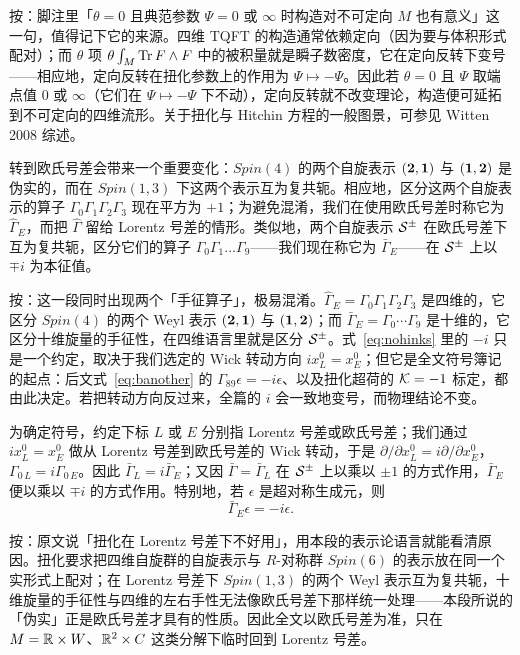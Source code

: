 \begin{yizhu}[物理图像]
按：脚注里「$\theta=0$ 且典范参数 $\Psi=0$ 或 $\infty$ 时构造对不可定向 $M$ 也有意义」这一句，值得记下它的来源。四维 TQFT 的构造通常依赖定向（因为要与体积形式配对）；而 $\theta$ 项 $\theta\int_M\Tr F\wedge F$ 中的被积量就是瞬子数密度，它在定向反转下变号——相应地，定向反转在扭化参数上的作用为 $\Psi\mapsto-\Psi$。因此若 $\theta=0$ 且 $\Psi$ 取端点值 $0$ 或 $\infty$（它们在 $\Psi\mapsto-\Psi$ 下不动），定向反转就不改变理论，构造便可延拓到不可定向的四维流形。关于扭化与 Hitchin 方程的一般图景，可参见 Witten 2008 综述。
\end{yizhu}

转到欧氏号差会带来一个重要变化：$Spin(4)$ 的两个自旋表示 $(\btwo,\bone)$ 与 $(\bone,\btwo)$ 是伪实的，而在 $Spin(1,3)$ 下这两个表示互为复共轭。相应地，区分这两个自旋表示的算子 $\Gamma_0\Gamma_1\Gamma_2\Gamma_3$ 现在平方为 $+1$；为避免混淆，我们在使用欧氏号差时称它为 $\hat\Gamma_E$，而把 $\hat\Gamma$ 留给 Lorentz 号差的情形。类似地，两个自旋表示 ${\EUS}^\pm$ 在欧氏号差下互为复共轭，区分它们的算子 $\Gamma_0\Gamma_1\dots\Gamma_9$——我们现在称它为 $\bar\Gamma_E$——在 ${\EUS}^\pm$ 上以 $\mp i$ 为本征值。

\begin{yizhu}[易错点]
按：这一段同时出现两个「手征算子」，极易混淆。$\hat\Gamma_E=\Gamma_0\Gamma_1\Gamma_2\Gamma_3$ 是四维的，它区分 $Spin(4)$ 的两个 Weyl 表示 $(\btwo,\bone)$ 与 $(\bone,\btwo)$；而 $\bar\Gamma_E=\Gamma_0\cdots\Gamma_9$ 是十维的，它区分十维旋量的手征性，在四维语言里就是区分 ${\EUS}^\pm$。式~\eqref{eq:nohinks} 里的 $-i$ 只是一个约定，取决于我们选定的 Wick 转动方向 $ix^0_L=x^0_E$；但它是全文符号簿记的起点：后文式~\eqref{eq:banother} 的 $\Gamma_{89}\epsilon=-i\epsilon$、以及扭化超荷的 $\EUK=-1$ 标定，都由此决定。若把转动方向反过来，全篇的 $i$ 会一致地变号，而物理结论不变。
\end{yizhu}

为确定符号，约定下标 $L$ 或 $E$ 分别指 Lorentz 号差或欧氏号差；我们通过 $ix^0_L=x^0_E$ 做从 Lorentz 号差到欧氏号差的 Wick 转动，于是 $\partial/\partial x^0_L=i\partial/\partial x^0_E$，$\Gamma_{0\,L}=i\Gamma_{0\,E}$。因此 $\bar\Gamma_L=i\bar\Gamma_E$；又因 $\bar\Gamma=\bar\Gamma_L$ 在 ${\EUS}^\pm$ 上以乘以 $\pm 1$ 的方式作用，$\bar\Gamma_E$ 便以乘以 $\mp i$ 的方式作用。特别地，若 $\epsilon$ 是超对称生成元，则
\setcounter{equation}{0}
\begin{equation}\label{eq:nohinks}
\bar\Gamma_E\epsilon=-i\epsilon.
\end{equation}

\begin{yizhu}[含糊点拨]
按：原文说「扭化在 Lorentz 号差下不好用」，用本段的表示论语言就能看清原因。扭化要求把四维自旋群的自旋表示与 $R$-对称群 $Spin(6)$ 的表示放在同一个实形式上配对；在 Lorentz 号差下 $Spin(1,3)$ 的两个 Weyl 表示互为复共轭，十维旋量的手征性与四维的左右手性无法像欧氏号差下那样统一处理——本段所说的「伪实」正是欧氏号差才具有的性质。因此全文以欧氏号差为准，只在 $M=\Bbb{R}\times W$、$\Bbb{R}^2\times C$ 这类分解下临时回到 Lorentz 号差。
\end{yizhu}
